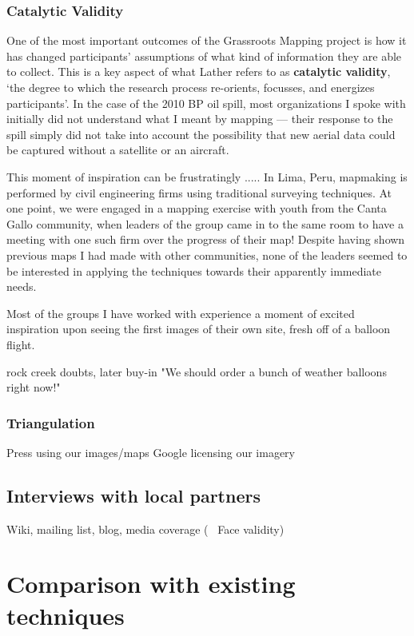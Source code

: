 \documentclass[11pt,oneside,notitlepage]{report}
\begin{document}
\subsubsection{Catalytic Validity}

One of the most important outcomes of the Grassroots Mapping project is how it has changed participants' assumptions of what kind of information they are able to collect. This is a key aspect of what Lather refers to as \textbf{catalytic validity}, `the degree to which the research process re-orients, focusses, and energizes participants'. In the case of the 2010 BP oil spill, most organizations I spoke with initially did not understand what I meant by mapping --- their response to the spill simply did not take into account the possibility that new aerial data could be captured without a satellite or an aircraft. 

This moment of inspiration can be frustratingly ..... In Lima, Peru, mapmaking is performed by civil engineering firms using traditional surveying techniques. At one point, we were engaged in a mapping exercise with youth from the Canta Gallo community, when leaders of the group came in to the same room to have a meeting with one such firm over the progress of their map! Despite having shown previous maps I had made with other communities, none of the leaders seemed to be interested in applying the techniques towards their apparently immediate needs.  

Most of the groups I have worked with experience a moment of excited inspiration upon seeing the first images of their own site, fresh off of a balloon flight. 

rock creek doubts, later buy-in "We should order a bunch of weather balloons right now!"

\subsubsection{Triangulation}

Press using our images/maps
Google licensing our imagery

\subsection{Interviews with local partners}
Wiki, mailing list, blog, media coverage (~ Face validity)

\section{Comparison with existing techniques}
\end{document}
